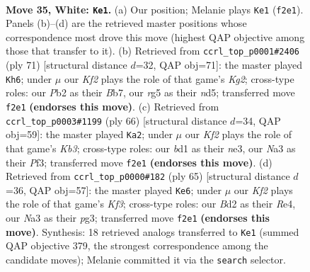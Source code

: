 \documentclass[11pt]{article}
\begin{document}
\clearpage

\begin{figure}[p]\centering
\begin{subfigure}{0.46\textwidth}\centering
\resizebox{\linewidth}{!}{%
\newchessgame
\chessboard[
  setfen={5r2/pp4k1/8/2p3r1/4p3/N3P3/PP1B1K2/R2b4 w - - 4 35},
  showmover=false,
  pgfstyle=straightmove, color=movearrow, markmove={f2-e1}
]}
\caption{}
\end{subfigure}\hfill
\begin{subfigure}{0.46\textwidth}\centering
\resizebox{\linewidth}{!}{%
\newchessgame
\chessboard[
  setfen={5r2/pb3pk1/8/3NnP2/1p5P/8/P1P1B3/2K3R1 b - - 4 36},
  showmover=false,
  pgfstyle=straightmove, color=movearrow, markmove={g7-h6}
]}
\caption{}
\end{subfigure}
\\[4pt]
\begin{subfigure}{0.46\textwidth}\centering
\resizebox{\linewidth}{!}{%
\newchessgame
\chessboard[
  setfen={kr6/p6p/2p5/5pPR/N7/1K2nP2/4P3/8 w - - 1 34},
  showmover=false,
  pgfstyle=straightmove, color=movearrow, markmove={b3-a2}
]}
\caption{}
\end{subfigure}\hfill
\begin{subfigure}{0.46\textwidth}\centering
\resizebox{\linewidth}{!}{%
\newchessgame
\chessboard[
  setfen={7r/3R4/p4kp1/3p3p/4r3/6P1/P1P4P/2K2R2 b - - 1 33},
  showmover=false,
  pgfstyle=straightmove, color=movearrow, markmove={f6-e6}
]}
\caption{}
\end{subfigure}
\caption{\textbf{Move 35, White: \texttt{Ke1}.} (a) Our position; Melanie plays \texttt{Ke1} (\texttt{f2e1}). Panels (b)--(d) are the retrieved master positions whose correspondence most drove this move (highest QAP objective among those that transfer to it). (b) Retrieved from \texttt{ccrl\_top\_p0001\#2406} (ply 71) [structural distance $d$=32, QAP obj=71]: the master played \texttt{Kh6}; under $\mu$ our \emph{Kf2} plays the role of that game's \emph{Kg2}; cross-type roles: our \emph{P}b2 as their \emph{B}b7, our \emph{r}g5 as their \emph{n}d5; transferred move \texttt{f2e1} \textbf{(endorses this move)}. (c) Retrieved from \texttt{ccrl\_top\_p0003\#1199} (ply 66) [structural distance $d$=34, QAP obj=59]: the master played \texttt{Ka2}; under $\mu$ our \emph{Kf2} plays the role of that game's \emph{Kb3}; cross-type roles: our \emph{b}d1 as their \emph{n}e3, our \emph{N}a3 as their \emph{P}f3; transferred move \texttt{f2e1} \textbf{(endorses this move)}. (d) Retrieved from \texttt{ccrl\_top\_p0000\#182} (ply 65) [structural distance $d$=36, QAP obj=57]: the master played \texttt{Ke6}; under $\mu$ our \emph{Kf2} plays the role of that game's \emph{Kf3}; cross-type roles: our \emph{B}d2 as their \emph{R}e4, our \emph{N}a3 as their \emph{p}g3; transferred move \texttt{f2e1} \textbf{(endorses this move)}. Synthesis: 18 retrieved analogs transferred to \texttt{Ke1} (summed QAP objective 379, the strongest correspondence among the candidate moves); Melanie committed it via the \texttt{search} selector.}
\label{fig:thought-m68}
\end{figure}
\end{document}
